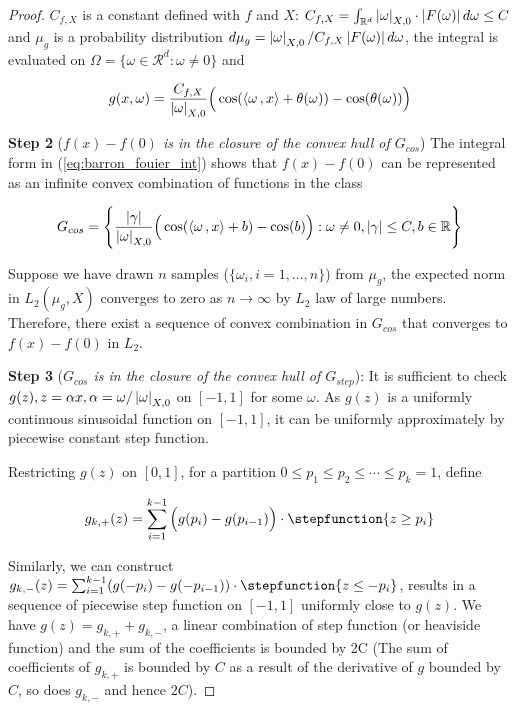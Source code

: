 \begin{proof}
    $C_{f,X}$ is a constant defined with $f$ and $X$: $C_{f,X} =
        \int_{\mathbb{R}^d} \left| \omega \right|_{X, 0} \cdot \left| F(\omega) \right| d\omega \leq
        C$ and $\mu_g$ is a probability distribution $d\mu_g =
        \left| \omega \right|_{X,0}/C_{f,X}\left| F(\omega) \right| d\omega$, the integral is
    evaluated on $\Omega = \{\omega \in \mathcal{R}^d: \omega \not = 0\}$ and

    \begin{equation}
        g(x, \omega) = \frac{C_{f,X}}{\left| \omega \right|_{X, 0}}\Big(\cos(\left\langle \omega\, , x \right\rangle + \theta(\omega)) - \cos(\theta(\omega))\Big)
    \end{equation}

    \textbf{Step 2} (\textit{$f(x) - f(0)$ is in the closure of the convex hull
        of $G_{cos}$}) The integral form in (\ref{eq:barron_fouier_int}) shows that
    $f(x) - f(0)$ can be represented as an infinite convex combination of
    functions in the class

    \begin{equation}
        G_{cos} = \Bigg\{\frac{\left| \gamma \right|}{\left| \omega \right|_{X, 0}}\Big(\cos(\left\langle \omega\, , x \right\rangle + b) - \cos(b)\Big): \omega \not= 0, \left| \gamma \right| \leq C, b \in \mathbb{R} \Bigg\}
    \end{equation}

    Suppose we have drawn $n$ samples ($\{\omega_i, i = 1,\dots, n\}$) from
    $\mu_g$, the expected norm in $L_2(\mu_g, X)$ converges to zero as $n \to
        \infty$ by $L_2$ law of large numbers. Therefore, there exist a sequence of
    convex combination in $G_{cos}$ that converges to $f(x) - f(0)$ in $L_2$.


    \textbf{Step 3} (\textit{$G_{cos}$ is in the closure of the convex hull of
        $G_{step}$}): It is sufficient to check $g(z), z = \alpha x, \alpha =
        \omega/\left| \omega \right|_{X,0}$ on $[-1, 1]$ for some $\omega$. As $g(z)$ is a
    uniformly continuous sinusoidal function on $[-1, 1]$, it can be uniformly
    approximately by piecewise constant step function.

    Restricting $g(z)$ on $[0, 1]$, for a partition ${0 \leq p_1 \leq p_2 \leq
                \cdots \leq p_k = 1}$, define

    \begin{align}
        g_{k,+}(z) = \sum_{i=1}^{k-1} \Big(g(p_i) - g(p_{i-1})\Big) \cdot
        \stepfunction{z\geq p_i}
    \end{align}

    Similarly, we can construct $g_{k,-}(z) = \sum_{i=1}^{k-1} (g(-p_i) -
        g(-p_{i-1})) \cdot \stepfunction{z\leq -p_i}$, results in a sequence of
    piecewise step function on $[-1, 1]$ uniformly close to $g(z)$. We have
    $g(z) = g_{k,+}+g_{k,-}$, a linear combination of step function (or
    heaviside function) and the sum of the coefficients is bounded by 2C (The
    sum of coefficients of $g_{k,+}$ is bounded by $C$ as a result of the
    derivative of $g$ bounded by $C$, so does $g_{k,-}$ and hence $2C$).


\end{proof}
